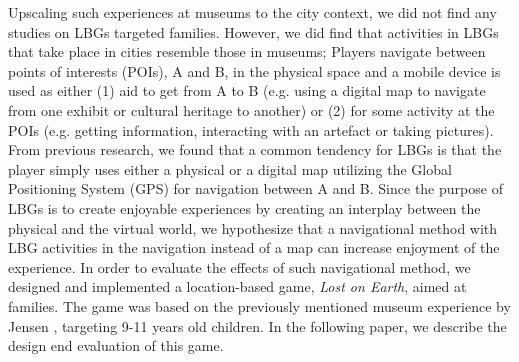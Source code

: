 Upscaling such experiences at museums to the city context, we did not find any studies on LBGs targeted families. However, we did find that activities in LBGs that take place in cities resemble those in museums; Players navigate between points of interests (POIs), A and B, in the physical space and a mobile device is used as either (1) aid to get from A to B (e.g. using a digital map to navigate from one exhibit or cultural heritage to another) or (2) for some activity at the POIs (e.g. getting information, interacting with an artefact or taking pictures). %
From previous research, we found that a common tendency for LBGs is that the player simply uses either a physical or a digital map utilizing the Global Positioning System (GPS) for navigation between A and B. Since the purpose of LBGs is to create enjoyable experiences by creating an interplay between the physical and the virtual world, we hypothesize that a navigational method with LBG activities in the navigation instead of a map can increase enjoyment of the experience. In order to evaluate the effects of such navigational method, we designed and implemented a location-based game, \textit{Lost on Earth}, aimed at families. The game was based on the previously mentioned museum experience by Jensen \cite{Lynge}, targeting 9-11 years old children. In the following paper, we describe the design end evaluation of this game. 




